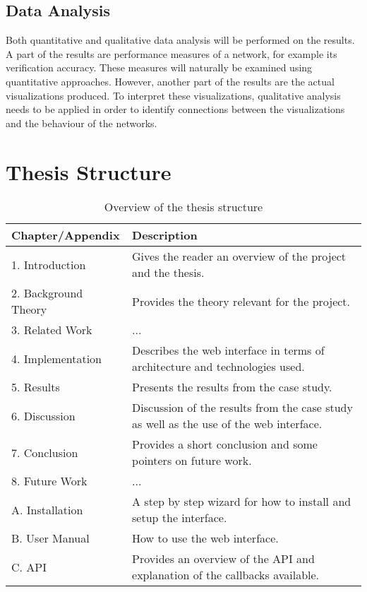 \subsection{Data Analysis}

Both quantitative and qualitative data analysis will be performed on the results. A part of the results are performance measures of a network, for example its verification accuracy. These measures will naturally be examined using quantitative approaches. However, another part of the results are the actual visualizations produced. To interpret these visualizations, qualitative analysis needs to be applied in order to identify connections between the visualizations and the behaviour of the networks.

\section{Thesis Structure}

\begin{table}[!h]
\begin{center}
\begin{tabular}{ | l | p{8cm} |}
\hline
\textbf{Chapter/Appendix} & \textbf{Description} \\ \hline
1. Introduction & Gives the reader an overview of the project and the thesis. \\ \hline
2. Background Theory & Provides the theory relevant for the project. \\ \hline
3. Related Work & ... \\ \hline
4. Implementation & Describes the web interface in terms of architecture and technologies used. \\ \hline
5. Results & Presents the results from the case study. \\ \hline
6. Discussion & Discussion of the results from the case study as well as the use of the web interface. \\ \hline
7. Conclusion & Provides a short conclusion and some pointers on future work. \\ \hline
8. Future Work & ... \\ \hline
A. Installation & A step by step wizard for how to install and setup the interface. \\ \hline
B. User Manual & How to use the web interface. \\ \hline
C. API & Provides an overview of the API and explanation of the callbacks available. \\ \hline
\end{tabular}
\end{center}
\caption{Overview of the thesis structure}
\label{tab:1}
\end{table}

\cleardoublepage